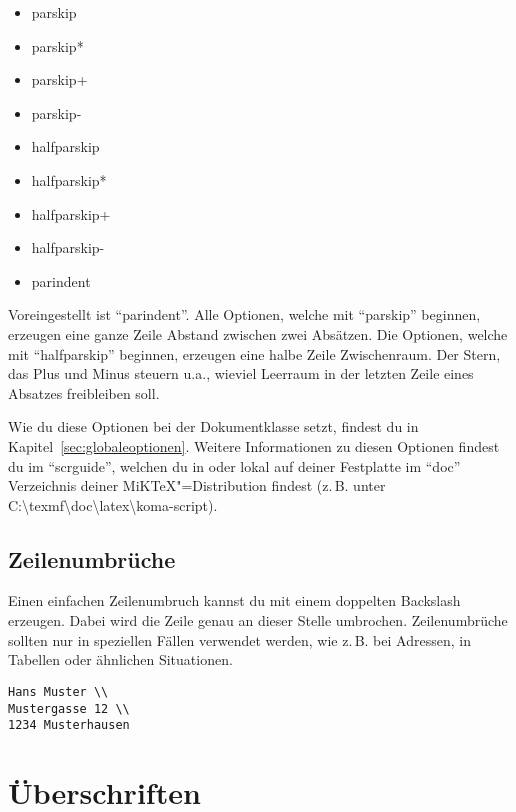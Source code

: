 \begin{itemize}
	\item parskip
	\item parskip*
	\item parskip+
	\item parskip-
	\item halfparskip
	\item halfparskip*
	\item halfparskip+
	\item halfparskip-
	\item parindent
\end{itemize}

Voreingestellt ist \enquote{parindent}. Alle Optionen, welche mit \enquote{parskip} beginnen, erzeugen eine ganze Zeile Abstand zwischen zwei Absätzen. Die Optionen, welche mit \enquote{halfparskip} beginnen, erzeugen eine halbe Zeile Zwischenraum. Der Stern, das Plus und Minus steuern u.a., wieviel Leerraum in der letzten Zeile eines Absatzes freibleiben soll.

Wie du diese Optionen bei der Dokumentklasse setzt, findest du in Kapitel~\ref{sec:globaleoptionen}. Weitere Informationen zu diesen Optionen findest du im \enquote{scrguide}, welchen du in \cite{KOMA} oder lokal auf deiner Festplatte im \enquote{doc} Verzeichnis deiner MiKTeX"=Distribution findest (z.\,B. unter C:\textbackslash texmf\textbackslash doc\textbackslash latex\textbackslash koma-script).

\subsection{Zeilenumbrüche}

Einen einfachen Zeilenumbruch kannst du mit einem doppelten Backslash erzeugen. Dabei wird die Zeile genau an dieser Stelle umbrochen. Zeilenumbrüche sollten nur in speziellen Fällen verwendet werden, wie z.\,B. bei Adressen, in Tabellen oder ähnlichen Situationen.
\begin{lstlisting}
Hans Muster \\
Mustergasse 12 \\
1234 Musterhausen
\end{lstlisting}

\section{Überschriften}

